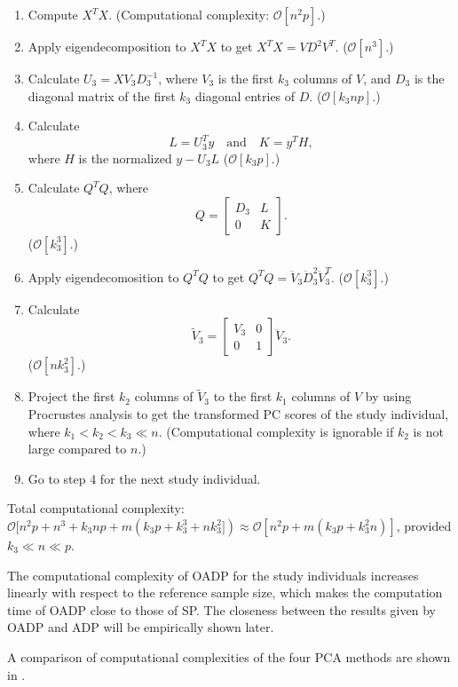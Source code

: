 \documentclass{article}
\newcommand{\bO}{\mathcal{O}}
\begin{document}
\begin{enumerate}
\item Compute $X^T X$.
  (Computational complexity: $\bO[n^2p]$.)  
\item Apply eigendecomposition to $X^T X$ to get $X^T X = V D^2 V^T$.
  ($\bO[n^3]$.)
\item Calculate $U_3 = X V_3 D_3^{-1}$,
  where $V_3$ is the first $k_3$ columns of $V$,
  and $D_3$ is the diagonal matrix of the first $k_3$ diagonal entries of $D$.
  ($\bO[k_3 n p]$.)
\item Calculate 
  \[
    L = U_3^T y \quad \text{and} \quad K = y^T H,
  \]
  where $H$ is the normalized  $y - U_3L$
  ($\bO[k_3 p]$.)
\item Calculate $Q^T Q$, where
  \[
    Q = 
    \begin{bmatrix}
      D_3 & L \\
      0 & K
    \end{bmatrix}.
  \]
  ($\bO[k_3^3]$.)
\item Apply eigendecomosition to $Q^T Q$ to get $Q^T Q = \ddot{V}_3 \ddot{D}^2_3 \ddot{V}^T_3$.
  ($\bO[k_3^3]$.)
\item Calculate
  \[
    \tilde{V}_3 =
    \begin{bmatrix}
      V_3 & 0 \\
      0 & 1
    \end{bmatrix}
    \ddot{V}_3.
  \]
  ($\bO[nk_3^2]$.)
\item Project the first $k_2$ columns of $\tilde{V}_3$ to the first $k_1$ columns of $V$ by using Procrustes analysis to get the transformed PC scores of the study individual,
  where $k_1 < k_2  < k_3 \ll n$.
  (Computational complexity is ignorable if $k_2$ is not large compared to $n$.)
  \item Go to step 4 for the next study individual.
\end{enumerate}

Total computational complexity: $\bO[n^2p + n^3 + k_3np + m(k_3p + k_3^3 + nk_3^2]) \approx \bO[n^2p + m(k_3p + k_3^2n)]$, provided $k_3 \ll n \ll p$.

The computational complexity of OADP for the study individuals increases linearly with respect to the reference sample size, which makes the computation time of OADP close to those of SP.
The closeness between the results given by OADP and ADP will be empirically shown later.

A comparison of computational complexities of the four PCA methods are shown in .
\end{document}
